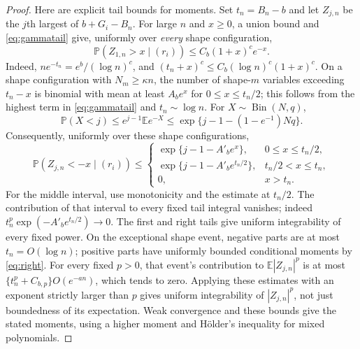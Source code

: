 \documentclass[11pt]{article}
\theoremstyle{remark}\newtheorem{remark}[theorem]{Remark}
\newcommand{\Pbb}{\mathbb P}
\newcommand{\Ebb}{\mathbb E}
\begin{document}
\begin{proof}
Here are explicit tail bounds for moments. Set $t_n=B_n-b$ and let $Z_{j,n}$
be the $j$th largest of $b+G_i-B_n$. For large $n$ and $x\ge0$, a union bound
and \eqref{eq:gammatail} give, uniformly over \emph{every} shape configuration,
\begin{equation}\label{eq:right}
 \Pbb(Z_{1,n}>x\mid(r_i))\le C_b(1+x)^c e^{-x}.
\end{equation}
Indeed, $n e^{-t_n}=e^b/(\log n)^c$, and
$(t_n+x)^c\le C_b(\log n)^c(1+x)^c$.
On a shape configuration with $N_m\ge\kappa n$, the number of shape-$m$
variables exceeding $t_n-x$ is binomial with mean at least
$A_b e^x$ for $0\le x\le t_n/2$; this follows from the highest term in
\eqref{eq:gammatail} and $t_n\sim\log n$.
For $X\sim\operatorname{Bin}(N,q)$,
\[
 \Pbb(X<j)\le e^{j-1}\Ebb e^{-X}
       \le \exp\{j-1-(1-e^{-1})Nq\}.
\]
Consequently, uniformly over these shape configurations,
\begin{equation}\label{eq:left}
 \Pbb(Z_{j,n}<-x\mid(r_i))\le
 \begin{cases}
 \exp\{j-1-A'_b e^x\},&0\le x\le t_n/2,\\
 \exp\{j-1-A'_b e^{t_n/2}\},&t_n/2<x\le t_n,\\
 0,&x>t_n.
 \end{cases}
\end{equation}
For the middle interval, use monotonicity and the estimate at $t_n/2$.
The contribution of that interval to every fixed tail integral vanishes;
indeed $t_n^p\exp(-A'_b e^{t_n/2})\to0$.
The first and right tails give uniform integrability of every fixed power.
On the exceptional shape event, negative parts are at most $t_n=O(\log n)$;
positive parts have uniformly bounded conditional moments by
\eqref{eq:right}. For every fixed $p>0$, that event's contribution to
$\Ebb|Z_{j,n}|^p$ is at most
$\{t_n^p+C_{b,p}\}O(e^{-an})$, which tends to zero. Applying these estimates
with an exponent strictly larger than $p$ gives uniform integrability of
$|Z_{j,n}|^p$, not just boundedness of its expectation.
Weak convergence and these bounds give the stated moments, using a higher
moment and H\"older's inequality for mixed polynomials.
\end{proof}
\end{document}
